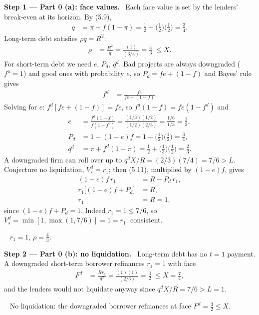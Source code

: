\documentclass[11pt,a4paper]{article}
\newcommand{\step}[2]{\par\medskip\noindent\textbf{Step #1 --- #2.}~}
\newcommand{\answer}[1]{\par\smallskip\noindent\fbox{\textbf{Answer #1.}}~}
\begin{document}
\step{1}{Part 0 (a): face values} Each face value is set by the lenders' break-even at its horizon. By (5.9),
\begin{align}
  q &= \pi+f(1-\pi) = \tfrac12+\big(\tfrac12\big)\big(\tfrac12\big) = \tfrac34. \label{t5e12-q}
\end{align}
Long-term debt satisfies $\rho q=R^2$:
\begin{align}
  \rho &= \frac{R^2}{q} = \frac{(1)}{(3/4)} = \frac43 \;\le X. \label{t5e12-rho}
\end{align}
For short-term debt we need $e$, $P_d$, $q^d$. Bad projects are always downgraded ($f^u=1$) and good ones
with probability $e$, so $P_d=fe+(1-f)$ and Bayes' rule gives
\begin{align}
  f^d &= \frac{fe}{fe+(1-f)}. \label{t5e12-bayes}
\end{align}
Solving for $e$: $f^d[fe+(1-f)]=fe$, so $f^d(1-f)=fe(1-f^d)$ and
\begin{align}
  e &= \frac{f^d(1-f)}{f(1-f^d)} = \frac{(1/3)(1/2)}{(1/2)(2/3)} = \frac{1/6}{1/3} = \frac12, \label{t5e12-e}\\
  P_d &= 1-(1-e)f = 1-\big(\tfrac12\big)\big(\tfrac12\big) = \tfrac34, \label{t5e12-Pd}\\
  q^d &= \pi+f^d(1-\pi) = \tfrac12+\big(\tfrac13\big)\big(\tfrac12\big)=\tfrac23. \label{t5e12-qd}
\end{align}
A downgraded firm can roll over up to $q^dX/R=(2/3)(7/4)=7/6>L$. Conjecture no liquidation, $V_s^d=r_1$; then (5.11),
multiplied by $(1-e)f$, gives
\begin{align}
  (1-e)f\,r_1 &= R-P_d\,r_1, \nonumber\\
  r_1\big[(1-e)f+P_d\big] &= R, \nonumber\\
  r_1 &= R = 1, \label{t5e12-r1}
\end{align}
since $(1-e)f+P_d=1$. Indeed $r_1=1\le 7/6$, so $V_s^d=\min[1,\max(1,7/6)]=1=r_1$: consistent.

\answer{0(a)} $r_1=1$, $\rho=\tfrac43$.

\step{2}{Part 0 (b): no liquidation} Long-term debt has no $t=1$ payment. A downgraded short-term borrower refinances $r_1=1$ with face
\begin{align}
  F^d &= \frac{Rr_1}{q^d} = \frac{(1)(1)}{(2/3)} = \frac32 \;\le X=\frac74, \label{t5e12-Fd}
\end{align}
and the lenders would not liquidate anyway since $q^dX/R=7/6>L=1$.

\answer{0(b)} No liquidation: the downgraded borrower refinances at face $F^d=\tfrac32\le X$.
\end{document}
